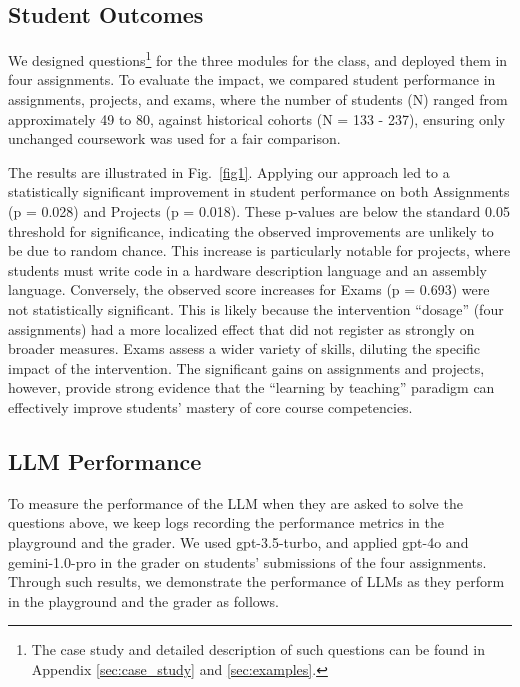 \documentclass{article} %
\begin{document}
\subsection{Student Outcomes}




We designed questions\footnote{The case study and detailed description of such questions can be found in Appendix \ref{sec:case_study} and \ref{sec:examples}.} for the three modules for the class, and deployed them in four assignments. To evaluate the impact, we compared student performance in assignments, projects, and exams, where the number of students (N) ranged from approximately 49 to 80, against historical cohorts (N = 133 - 237), ensuring only unchanged coursework was used for a fair comparison. 

The results are illustrated in Fig.~\ref{fig1}. Applying our approach led to a statistically significant improvement in student performance on both Assignments (p = 0.028) and Projects (p = 0.018). These p-values are below the standard 0.05 threshold for significance, indicating the observed improvements are unlikely to be due to random chance. This increase is particularly notable for projects, where students must write code in a hardware description language and an assembly language. Conversely, the observed score increases for Exams (p = 0.693) were not statistically significant. This is likely because the intervention ``dosage'' (four assignments) had a more localized effect that did not register as strongly on broader measures. Exams assess a wider variety of skills, diluting the specific impact of the intervention. The significant gains on assignments and projects, however, provide strong evidence that the ``learning by teaching'' paradigm can effectively improve students' mastery of core course competencies.
\subsection{LLM Performance}

To measure the performance of the LLM when they are asked to solve the questions above, we keep logs recording the performance metrics in the playground and the grader. We used \textsf{gpt-3.5-turbo},
and applied \textsf{gpt-4o} and \textsf{gemini-1.0-pro} in the grader on students' submissions of the four assignments.
Through such results, we demonstrate the performance of LLMs as they perform in the playground and the grader as follows.
\end{document}
